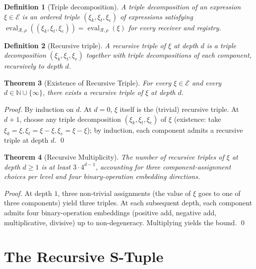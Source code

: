 \documentclass[twocolumn,a4paper]{article}
\newtheorem{theorem}{Theorem}[section]
\newtheorem{definition}[theorem]{Definition}
\DeclareMathOperator{\eval}{eval}
\newcommand{\Natural}{\mathbb{N}}
\newcommand{\Expr}{\mathcal{E}}
\newcommand{\receiver}{\mathcal{R}}
\begin{document}
\begin{definition}[Triple decomposition]
\label{def:triple-decomp}
A \emph{triple decomposition} of an expression $\xi\in\Expr$ is an ordered triple $(\xi_{k},\xi_{t},\xi_{e})$ of expressions satisfying $\eval_{\receiver,\rho}((\xi_{k},\xi_{t},\xi_{e}))=\eval_{\receiver,\rho}(\xi)$ for every receiver and registry.
\end{definition}

\begin{definition}[Recursive triple]
\label{def:rec-triple}
A \emph{recursive triple} of $\xi$ at depth $d$ is a triple decomposition $(\xi_{k},\xi_{t},\xi_{e})$ together with triple decompositions of each component, recursively to depth $d$.
\end{definition}

\begin{theorem}[Existence of Recursive Triple]
\label{thm:rec-existence}
For every $\xi\in\Expr$ and every $d\in\Natural\cup\{\infty\}$, there exists a recursive triple of $\xi$ at depth $d$.
\end{theorem}

\begin{proof}
By induction on $d$. At $d=0$, $\xi$ itself is the (trivial) recursive triple. At $d+1$, choose any triple decomposition $(\xi_{k},\xi_{t},\xi_{e})$ of $\xi$ (existence: take $\xi_{k}=\xi,\xi_{t}=\xi-\xi,\xi_{e}=\xi-\xi$); by induction, each component admits a recursive triple at depth $d$. \qed
\end{proof}

\begin{theorem}[Recursive Multiplicity]
\label{thm:rec-multiplicity}
The number of recursive triples of $\xi$ at depth $d\geq 1$ is at least $3\cdot 4^{d-1}$, accounting for three component-assignment choices per level and four binary-operation embedding directions.
\end{theorem}

\begin{proof}
At depth $1$, three non-trivial assignments (the value of $\xi$ goes to one of three components) yield three triples. At each subsequent depth, each component admits four binary-operation embeddings (positive add, negative add, multiplicative, divisive) up to non-degeneracy. Multiplying yields the bound. \qed
\end{proof}

\section{The Recursive S-Tuple}
\label{sec:rec-s-tuple}
\end{document}
